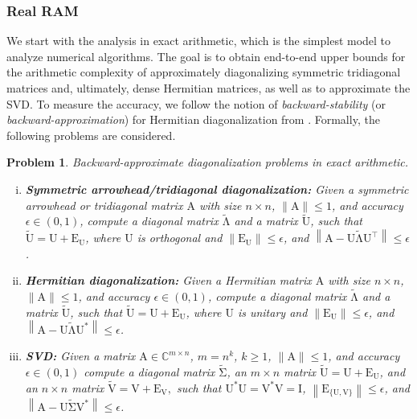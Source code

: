 \documentclass{article}
\newcommand{\lnorm}{\left\|}
\newcommand{\rnorm}{\right\|}
\newtheorem{problem}{Problem}[section]
\newcommand\matA{\boldsymbol{\mathrm{A}}}
\newcommand\matE{\boldsymbol{\mathrm{E}}}
\newcommand\matI{\boldsymbol{\mathrm{I}}}
\newcommand\matU{\boldsymbol{\mathrm{U}}}
\newcommand\matV{\boldsymbol{\mathrm{V}}}
\newcommand\matUtilde{\widetilde{\boldsymbol{\mathrm{U}}}}
\newcommand\matVtilde{\widetilde{\boldsymbol{\mathrm{V}}}}
\newcommand\matLambdatilde{\widetilde{\boldsymbol{\mathrm{\Lambda}}}}
\newcommand\matSigmatilde{\widetilde{\boldsymbol{\mathrm{\Sigma}}}}
\begin{document}
    \subsubsection{Real RAM}
    \label{paragraph:intro_real_ram} We start with the analysis in exact arithmetic, which is the simplest model to analyze numerical algorithms. The goal is to obtain end-to-end upper bounds for the arithmetic complexity of approximately diagonalizing symmetric tridiagonal matrices and, ultimately, dense Hermitian matrices, as well as to approximate the SVD. To measure the accuracy, we follow the notion of \textit{backward-stability} (or \textit{backward-approximation}) for Hermitian diagonalization from 
    \cite{nakatsukasa2013stable}.
    Formally, the following problems are considered.
    \begin{problem} Backward-approximate diagonalization problems in exact arithmetic.
        \label{problem:problems_in_exact_arithmetic}
        \begin{enumerate}[(i)]
            \item \textbf{Symmetric arrowhead/tridiagonal diagonalization:} Given a symmetric arrowhead or tridiagonal matrix $\matA$ with size $n\times n$, $\|\matA\|\leq 1$, and accuracy $\epsilon\in(0,1)$, compute a diagonal matrix $\matLambdatilde$ and a matrix $\matUtilde$, such that $\matUtilde=\matU+\matE_{\matU}$, where $\matU$ is orthogonal and $\|\matE_{\matU}\|\leq \epsilon$, and $\lnorm \matA-\matU\matLambdatilde\matU^\top \rnorm \leq \epsilon$.
            \item \textbf{Hermitian diagonalization:} Given a Hermitian matrix $\matA$ with size $n\times n$, $\|\matA\|\leq 1$, and accuracy $\epsilon\in(0,1)$, compute a diagonal matrix $\matLambdatilde$ and a matrix $\matUtilde$, such that $\matUtilde=\matU+\matE_{\matU}$, where $\matU$ is unitary and $\|\matE_{\matU}\|\leq \epsilon$, and $\lnorm \matA-\matU\matLambdatilde\matU^* \rnorm \leq \epsilon$.
            \item \textbf{SVD:} Given a matrix $\matA\in\mathbb{C}^{m\times n}$, $m=n^k$, $k\geq 1$, $\|\matA\|\leq 1$, and accuracy $\epsilon\in(0,1)$ compute a diagonal matrix $\matSigmatilde$, an $m\times n$ matrix $\matUtilde=\matU+\matE_{\matU}$, and an $n\times n$ matrix $\matVtilde=\matV+\matE_{\matV},$ such that $\matU^*\matU=\matV^*\matV=\matI$, $\lnorm \matE_{\{\matU,\matV\}}\rnorm \leq \epsilon$, and $\lnorm \matA-\matU\matSigmatilde\matV^* \rnorm \leq \epsilon$.
        \end{enumerate}
    \end{problem}
 
\end{document}
